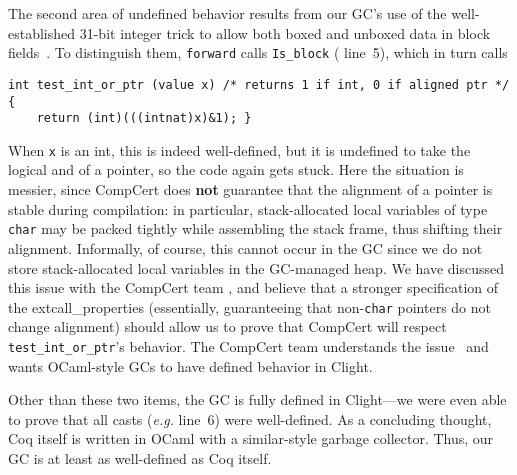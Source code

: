The second area of undefined behavior results from our GC's use of the well-established
31-bit integer trick to allow both boxed and unboxed data in block fields~\cite{realworldocaml}.
To distinguish them, \texttt{forward} calls \texttt{Is\_block} ({\color{red} line~5}), which
in turn calls
\begin{lstlisting}[numbers=none]
int test_int_or_ptr (value x) /* returns 1 if int, 0 if aligned ptr */ {
    return (int)(((intnat)x)&1); }
\end{lstlisting}
When \texttt{x} is an int, this is indeed well-defined, but it is undefined to take the
logical and of a pointer, so the code again gets stuck.  Here the situation is messier,
since CompCert does \textbf{not} guarantee that the alignment of a pointer is stable during 
compilation: in particular, stack-allocated local variables of type \texttt{char} may be packed
tightly while assembling the stack frame, thus shifting their alignment.  Informally, of course,
this cannot occur in the GC since we do not store stack-allocated local variables in the GC-managed
heap.  We have discussed this issue with the CompCert team \cite{leroy_email}, and believe that
a stronger specification of the extcall{\_}properties (essentially, guaranteeing that non-\texttt{char} pointers do not change alignment) should allow us to prove that CompCert
will respect \texttt{test\_int\_or\_ptr}'s behavior.  The CompCert team understands the 
issue~{\color{red}\cite{where}} and wants OCaml-style GCs to have defined behavior in Clight.

Other than these two items, the GC is fully defined in Clight---we were even able to 
prove that all casts (\emph{e.g.} {\color{red} line~6}) were well-defined.
As a concluding thought, Coq itself is written in OCaml with a similar-style garbage collector.
Thus, our GC is at least as well-defined as Coq itself.
